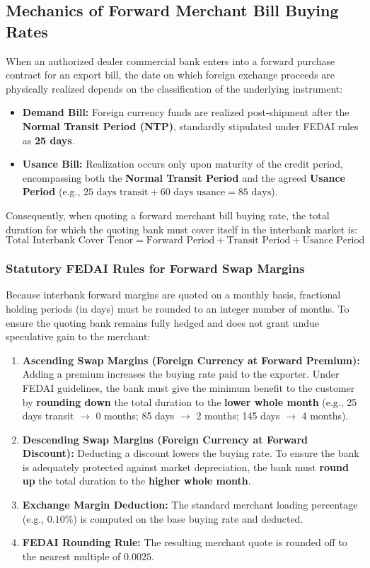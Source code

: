 \subsection{Mechanics of Forward Merchant Bill Buying Rates}
When an authorized dealer commercial bank enters into a forward purchase contract for an export bill, the date on which foreign exchange proceeds are physically realized depends on the classification of the underlying instrument:
\begin{itemize}[leftmargin=*]
    \item \textbf{Demand Bill:} Foreign currency funds are realized post-shipment after the \textbf{Normal Transit Period (NTP)}, standardly stipulated under FEDAI rules as \textbf{25 days}.
    \item \textbf{Usance Bill:} Realization occurs only upon maturity of the credit period, encompassing both the \textbf{Normal Transit Period} and the agreed \textbf{Usance Period} (e.g., $25 \text{ days transit} + 60 \text{ days usance} = 85 \text{ days}$).
\end{itemize}

Consequently, when quoting a forward merchant bill buying rate, the total duration for which the quoting bank must cover itself in the interbank market is:
\begin{equation}
    \text{Total Interbank Cover Tenor} = \text{Forward Period} + \text{Transit Period} + \text{Usance Period}
\end{equation}

\subsubsection{Statutory FEDAI Rules for Forward Swap Margins}
Because interbank forward margins are quoted on a monthly basis, fractional holding periods (in days) must be rounded to an integer number of months. To ensure the quoting bank remains fully hedged and does not grant undue speculative gain to the merchant:
\begin{enumerate}[leftmargin=*]
    \item \textbf{Ascending Swap Margins (Foreign Currency at Forward Premium):}
    Adding a premium increases the buying rate paid to the exporter. Under FEDAI guidelines, the bank must give the minimum benefit to the customer by \textbf{rounding down} the total duration to the \textbf{lower whole month} (e.g., 25 days transit $\to$ 0 months; 85 days $\to$ 2 months; 145 days $\to$ 4 months).
    \item \textbf{Descending Swap Margins (Foreign Currency at Forward Discount):}
    Deducting a discount lowers the buying rate. To ensure the bank is adequately protected against market depreciation, the bank must \textbf{round up} the total duration to the \textbf{higher whole month}.
    \item \textbf{Exchange Margin Deduction:}
    The standard merchant loading percentage (e.g., $0.10\%$) is computed on the base buying rate and deducted.
    \item \textbf{FEDAI Rounding Rule:}
    The resulting merchant quote is rounded off to the nearest multiple of $0.0025$.
\end{enumerate}

